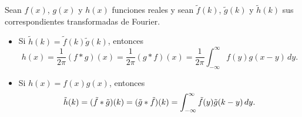 \begin{teorema}
Sean $f(x)$, $g(x)$ y $h(x)$  funciones reales y sean $\tilde{f}(k)$, $\tilde{g}(k)$ y $\tilde{h}(k)$ sus correspondientes transformadas de Fourier. 

\begin{itemize}
    \item Si $\tilde{h}(k) = \tilde{f}(k) \tilde{g}(k)$, entonces 
$$ h(x) = \frac{1}{2\pi} (f * g)(x) = \frac{1}{2\pi} (g * f)(x) = \frac{1}{2\pi} \int_{-\infty}^{\infty} f(y) g(x-y) \,dy.$$ 

    \item Si $h(x) = f(x) g(x)$, entonces
$$\Tilde{h}(k) = (\Tilde{f} * \Tilde{g})(k) = (\Tilde{g} * \Tilde{f})(k) = \int_{-\infty}^{\infty} \Tilde{f}(y) \Tilde{g}(k-y) \,dy.$$
\end{itemize}
\end{teorema}

